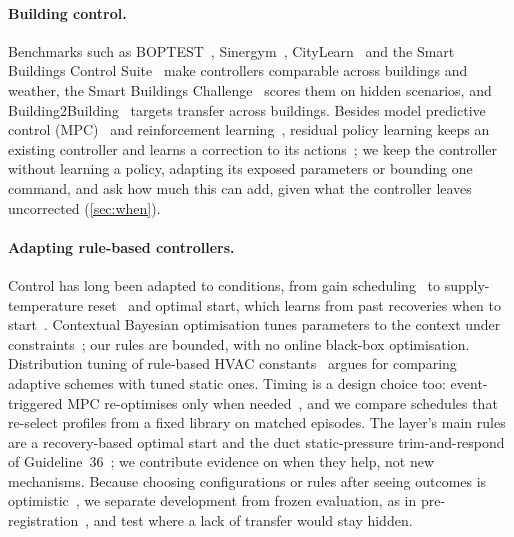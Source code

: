 \documentclass{article}
\begin{document}
\paragraph{Building control.}
Benchmarks such as BOPTEST~\cite{blum2021boptest}, Sinergym~\cite{jimenez2021sinergym}, CityLearn~\cite{vazquez2019citylearn}
and the Smart Buildings Control Suite~\cite{goldfeder2024suite} make controllers comparable across buildings and weather,
the Smart Buildings Challenge~\cite{goldfeder2026challenge} scores them on hidden scenarios, and
Building2Building~\cite{taboga2026b2b} targets transfer across buildings. Besides model predictive control
(MPC)~\cite{drgona2020mpc} and reinforcement learning~\cite{wang2020rl}, residual policy learning keeps an existing
controller and learns a correction to its actions~\cite{silver2018residual,johannink2019residual}; we keep the controller
without learning a policy, adapting its exposed parameters or bounding one command, and ask how much this can add, given
what the controller leaves uncorrected (\cref{sec:when}).

\paragraph{Adapting rule-based controllers.}
Control has long been adapted to conditions, from gain scheduling~\cite{rugh2000gain} to supply-temperature
reset~\cite{raftery2018reset} and optimal start, which learns from past recoveries when to
start~\cite{seem2016return,kim2024optimalstart}. Contextual Bayesian optimisation tunes parameters to the context under
constraints~\cite{fiducioso2019safe,xu2024primaldual}; our rules are bounded, with no online black-box optimisation.
Distribution tuning of rule-based HVAC constants~\cite{pacheco2026distribution} argues for comparing adaptive schemes
with tuned static ones. Timing is a design choice too: event-triggered MPC re-optimises only when
needed~\cite{yang2023event}, and we compare schedules that re-select profiles from a fixed library on matched episodes.
The layer's main rules are a recovery-based optimal start and the duct static-pressure trim-and-respond of
Guideline~36~\cite{ashrae2021g36}; we contribute evidence on when they help, not new mechanisms. Because choosing
configurations or rules after seeing outcomes is optimistic~\cite{cawley2010overfitting}, we separate development from
frozen evaluation, as in pre-registration~\cite{nosek2018prereg}, and test where a lack of transfer would stay
hidden.

\end{document}
